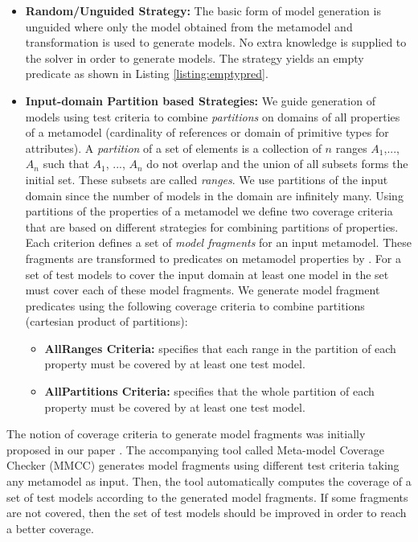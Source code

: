 \begin{itemize}
	\item \textbf{Random/Unguided Strategy:} The basic form of model generation is unguided where only the {\Alloy} model obtained from the metamodel and transformation is used to generate models. No extra knowledge is supplied to the solver in order to generate models. The strategy yields an empty {\Alloy} predicate as shown in Listing \ref{listing:emptypred}.
	
	


	\item \textbf{Input-domain Partition based Strategies:}
		We guide generation of models using test criteria to combine \emph{partitions} on domains of all properties of a metamodel (cardinality of references or domain of primitive types for attributes).  A \emph{partition} of a set of elements is a collection of $n$ ranges $A_1$,..., $A_n$ such that $A_1$, ..., $A_n$  do not overlap and the union of all subsets forms the initial set. These subsets are called \emph{ranges}. We use partitions of the input domain since the number of models in the domain are infinitely many. Using partitions of the properties of a metamodel we define two coverage criteria that are based on different strategies for combining partitions of properties. Each criterion defines a set of \emph{model fragments} for an input metamodel. These fragments are transformed to predicates on metamodel properties by {\Pramana}. For a set of test models to cover the input domain  at least one model in the set must cover each of these model fragments. We generate model fragment predicates using the following coverage criteria to combine partitions (cartesian product of partitions):
		\begin{itemize}
			\item \textbf{AllRanges Criteria:} {\AllRanges} specifies that each range in the partition of each property must be covered by at least one test model.
			\item \textbf{AllPartitions Criteria:} {\AllPartitions} specifies that the whole partition of each property must be covered by at least one test model.
		\end{itemize}

\end{itemize}

The notion of coverage criteria to generate model fragments was initially proposed in our paper \cite{franck2007}. The accompanying tool called Meta-model Coverage Checker (MMCC) \cite{franck2007} generates model fragments using different test criteria taking any metamodel as input. Then, the tool automatically computes the coverage of a set of test models according to the generated model fragments. If some fragments are not covered, then the set of test models should be improved in order to reach a better coverage. 

